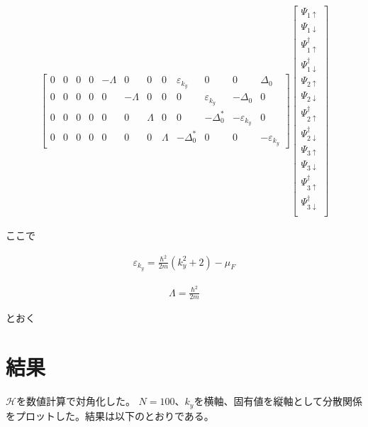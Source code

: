\documentclass{jsarticle}
\begin{document}
\begin{align}
\begin{bmatrix}
                    0 & 0 & 0 & 0 & -\varLambda & 0 & 0 & 0 & \varepsilon_{k_y} & 0 & 0 & \Delta_0 \\
                    0 & 0 & 0 & 0 & 0 & -\varLambda & 0 & 0 & 0 & \varepsilon_{k_y} & -\Delta_0 & 0 \\
                    0 & 0 & 0 & 0 & 0 & 0 & \varLambda & 0 & 0 & -\Delta_0^\ast & -\varepsilon_{k_y} & 0 \\
                    0 & 0 & 0 & 0 & 0 & 0 & 0 & \varLambda & -\Delta_0^\ast & 0 & 0 & -\varepsilon_{k_y}
                \end{bmatrix}
                \begin{bmatrix}
                    \Psi_{1\uparrow} \\
                    \Psi_{1\downarrow} \\
                    \Psi_{1\uparrow}^\dagger \\
                    \Psi_{1\downarrow}^\dagger \\
                    \Psi_{2\uparrow} \\
                    \Psi_{2\downarrow} \\
                    \Psi_{2\uparrow}^\dagger \\
                    \Psi_{2\downarrow}^\dagger \\
                    \Psi_{3\uparrow} \\
                    \Psi_{3\downarrow} \\
                    \Psi_{3\uparrow}^\dagger \\
                    \Psi_{3\downarrow}^\dagger \\
                \end{bmatrix}
            \end{align}
    
            ここで
    
            \begin{align}
                \varepsilon_{k_y}=\frac{\hbar^2}{2m}(k_y^2+2)-\mu_F
            \end{align}
    
            \begin{align}
                \varLambda=\frac{\hbar^2}{2m}
            \end{align}
    
            とおく
    
            \section{結果}
            $\mathcal{H}$を数値計算で対角化した。
            $N=100$、$k_y$を横軸、固有値を縦軸として分散関係をプロットした。結果は以下のとおりである。
    
\end{document}
